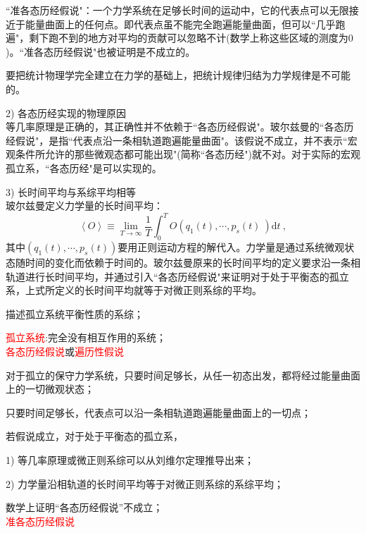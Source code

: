 \documentclass[12pt,a4paper]{article}
\newcommand{\dif}{\mathrm{d}}
\begin{document}
``准各态历经假说"：一个力学系统在足够长时间的运动中，它的代表点可以无限接近于能量曲面上的任何点。即代表点虽不能完全跑遍能量曲面，但可以``几乎跑遍"，剩下跑不到的地方对平均的贡献可以忽略不计(数学上称这些区域的测度为$0$)。``准各态历经假说"也被证明是不成立的。

要把统计物理学完全建立在力学的基础上，把统计规律归结为力学规律是不可能的。

2) 各态历经实现的物理原因 \\
等几率原理是正确的，其正确性并不依赖于``各态历经假说"。玻尔兹曼的``各态历经假说"，是指``代表点沿一条相轨道跑遍能量曲面"。该假说不成立，并不表示``宏观条件所允许的那些微观态都可能出现"(简称``各态历经")就不对。对于实际的宏观孤立系，``各态历经"是可以实现的。



3) 长时间平均与系综平均相等\\
玻尔兹曼定义力学量的长时间平均：
\begin{equation}
\left\langle O \right\rangle \equiv \lim_{T\rightarrow \infty} \frac{1}{T} \int_0^T O(q_1(t), \cdots, p_s(t)~ ) \dif t ~,
\end{equation}
其中$(q_1(t), \cdots, p_s(t) )$要用正则运动方程的解代入。力学量是通过系统微观状态随时间的变化而依赖于时间的。玻尔兹曼原来的长时间平均的定义要求沿一条相轨道进行长时间平均，并通过引入``各态历经假说"来证明对于处于平衡态的孤立系，上式所定义的长时间平均就等于对微正则系综的平均。





\cite{2007热力学与统计物理学} 



描述孤立系统平衡性质的系综； 

\textcolor{red}{孤立系统}:完全没有相互作用的系统；\\

\textcolor{red}{各态历经假说}或\textcolor{red}{遍历性假说}

对于孤立的保守力学系统，只要时间足够长，从任一初态出发，都将经过能量曲面上的一切微观状态；

只要时间足够长，代表点可以沿一条相轨道跑遍能量曲面上的一切点；

若假说成立，对于处于平衡态的孤立系，

1) 等几率原理或微正则系综可以从刘维尔定理推导出来；

2) 力学量沿相轨道的长时间平均等于对微正则系综的系综平均；

数学上证明“各态历经假说”不成立；\\

\textcolor{red}{准各态历经假说}
\end{document}
